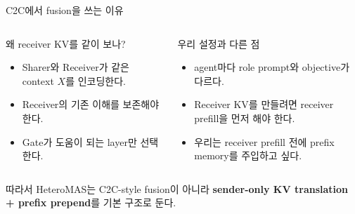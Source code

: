 \begin{frame}{C2C에서 fusion을 쓰는 이유}
\small
\begin{columns}[T,onlytextwidth]
\begin{block}{왜 receiver KV를 같이 보나?}
\begin{itemize}
  \item Sharer와 Receiver가 같은 context \(X\)를 인코딩한다.
  \item Receiver의 기존 이해를 보존해야 한다.
  \item Gate가 도움이 되는 layer만 선택한다.
\end{itemize}
\end{block}

\begin{block}{우리 설정과 다른 점}
\begin{itemize}
  \item agent마다 role prompt와 objective가 다르다.
  \item Receiver KV를 만들려면 receiver prefill을 먼저 해야 한다.
  \item 우리는 receiver prefill 전에 prefix memory를 주입하고 싶다.
\end{itemize}
\end{block}
\end{columns}

\vspace{0.7em}
\begin{block}{}
\small
따라서 HeteroMAS는 C2C-style fusion이 아니라 \textbf{sender-only KV translation + prefix prepend}를 기본 구조로 둔다.
\end{block}
\end{frame}

